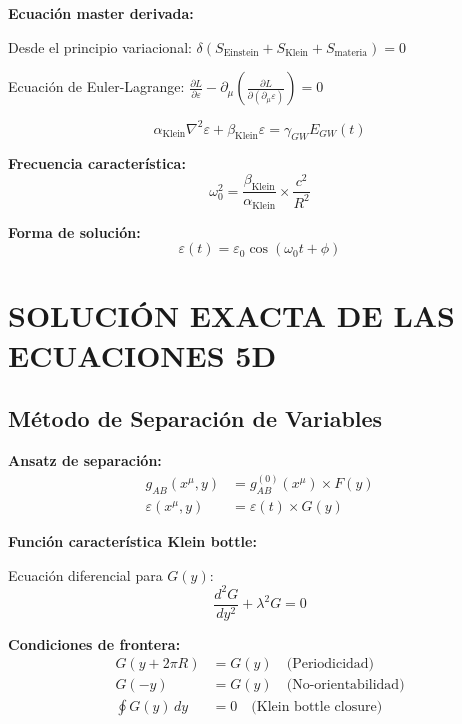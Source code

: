 \documentclass[12pt,a4paper]{article}
\begin{document}
\textbf{Ecuación master derivada:}

Desde el principio variacional: $\delta(S_{\text{Einstein}} + S_{\text{Klein}} + S_{\text{materia}}) = 0$

Ecuación de Euler-Lagrange: $\frac{\partial L}{\partial\varepsilon} - \partial_\mu\left(\frac{\partial L}{\partial(\partial_\mu \varepsilon)}\right) = 0$

\begin{equation}
\boxed{
\alpha_{\text{Klein}} \nabla^2\varepsilon + \beta_{\text{Klein}} \varepsilon = \gamma_{GW} E_{GW}(t)
}
\end{equation}

\textbf{Frecuencia característica:}
\begin{equation}
\omega_0^2 = \frac{\beta_{\text{Klein}}}{\alpha_{\text{Klein}}} \times \frac{c^2}{R^2}
\end{equation}

\textbf{Forma de solución:}
\begin{equation}
\varepsilon(t) = \varepsilon_0 \cos(\omega_0 t + \phi)
\end{equation}

\section{SOLUCIÓN EXACTA DE LAS ECUACIONES 5D}

\subsection{Método de Separación de Variables}

\textbf{Ansatz de separación:}
\begin{align}
g_{AB}(x^\mu, y) &= g_{AB}^{(0)}(x^\mu) \times F(y)\\
\varepsilon(x^\mu, y) &= \varepsilon(t) \times G(y)
\end{align}

\textbf{Función característica Klein bottle:}

Ecuación diferencial para $G(y)$:
\begin{equation}
\frac{d^2G}{dy^2} + \lambda^2G = 0
\end{equation}

\textbf{Condiciones de frontera:}
\begin{align}
G(y + 2\pi R) &= G(y) \quad \text{(Periodicidad)}\\
G(-y) &= G(y) \quad \text{(No-orientabilidad)}\\
\oint G(y) \, dy &= 0 \quad \text{(Klein bottle closure)}
\end{align}
\end{document}

